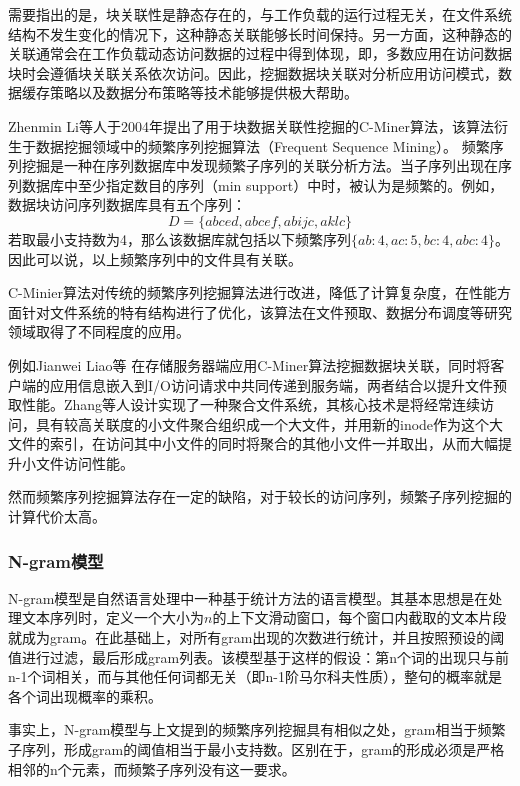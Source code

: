 需要指出的是，块关联性是静态存在的，与工作负载的运行过程无关，在文件系统结构不发生变化的情况下，这种静态关联能够长时间保持。另一方面，这种静态的关联通常会在工作负载动态访问数据的过程中得到体现，即，多数应用在访问数据块时会遵循块关联关系依次访问。因此，挖掘数据块关联对分析应用访问模式，数据缓存策略以及数据分布策略等技术能够提供极大帮助。

Zhenmin Li等人\cite{c_miner}于2004年提出了用于块数据关联性挖掘的C-Miner算法，该算法衍生于数据挖掘领域中的频繁序列挖掘算法（Frequent Sequence Mining）。
频繁序列挖掘是一种在序列数据库中发现频繁子序列的关联分析方法。当子序列出现在序列数据库中至少指定数目的序列（min support）中时，被认为是频繁的。例如，数据块访问序列数据库具有五个序列：
\begin{equation*}
    D = \{ abced, abcef, abijc, aklc \}
\end{equation*}
若取最小支持数为4，那么该数据库就包括以下频繁序列$\{ ab:4, ac:5, bc:4 ,abc:4 \}$。因此可以说，以上频繁序列中的文件具有关联。

C-Minier算法对传统的频繁序列挖掘算法进行改进，降低了计算复杂度，在性能方面针对文件系统的特有结构进行了优化，该算法在文件预取、数据分布调度等研究领域取得了不同程度的应用。

例如Jianwei Liao等
\cite{Prefetching_on_storage_servers_through_mining_access_patterns_on_blocks}
在存储服务器端应用C-Miner算法挖掘数据块关联，同时将客户端的应用信息嵌入到I/O访问请求中共同传递到服务端，两者结合以提升文件预取性能。Zhang等人\cite{composite_file}设计实现了一种聚合文件系统，其核心技术是将经常连续访问，具有较高关联度的小文件聚合组织成一个大文件，并用新的inode作为这个大文件的索引，在访问其中小文件的同时将聚合的其他小文件一并取出，从而大幅提升小文件访问性能。

然而频繁序列挖掘算法存在一定的缺陷，对于较长的访问序列，频繁子序列挖掘的计算代价太高。
\subsubsection*{N-gram模型}
N-gram模型是自然语言处理中一种基于统计方法的语言模型。其基本思想是在处理文本序列时，定义一个大小为$n$的上下文滑动窗口，每个窗口内截取的文本片段就成为gram。在此基础上，对所有gram出现的次数进行统计，并且按照预设的阈值进行过滤，最后形成gram列表。该模型基于这样的假设：第n个词的出现只与前n-1个词相关，而与其他任何词都无关（即n-1阶马尔科夫性质），整句的概率就是各个词出现概率的乘积。

事实上，N-gram模型与上文提到的频繁序列挖掘具有相似之处，gram相当于频繁子序列，形成gram的阈值相当于最小支持数。区别在于，gram的形成必须是严格相邻的n个元素，而频繁子序列没有这一要求。

